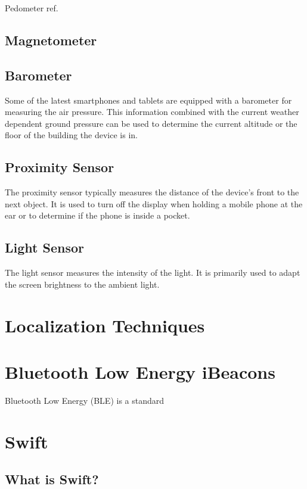 Pedometer ref.

\subsection{Magnetometer}

\subsection{Barometer}

Some of the latest smartphones and tablets are equipped with a barometer for measuring the air pressure. This information combined with the current weather dependent ground pressure can be used to determine the current altitude or the floor of the building the device is in. 

\subsection{Proximity Sensor}

The proximity sensor typically measures the distance of the device's front to the next object. It is used to turn off the display when holding a mobile phone at the ear or to determine if the phone is inside a pocket.

\subsection{Light Sensor}

The light sensor measures the intensity of the light. It is primarily used to adapt the screen brightness to the ambient light.

\section{Localization Techniques}



\section{Bluetooth Low Energy iBeacons}

Bluetooth Low Energy (BLE) is a standard %

\section{Swift}

\subsection{What is Swift?}

